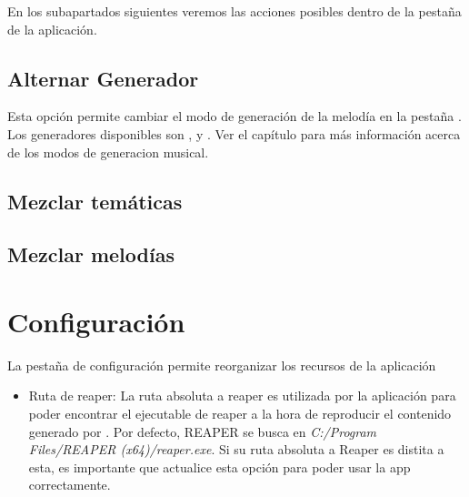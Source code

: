 En los subapartados siguientes veremos las acciones posibles dentro de la pestaña \advancedTabName{} de la aplicación.

\subsection{Alternar Generador}
\label{subsec:app:alternarGenerador}
Esta opción permite cambiar el modo de generación de la melodía en la pestaña \generationTabName{}. Los generadores disponibles son ,  y . Ver el capítulo  para más información acerca de los modos de generacion musical. 

\subsection{Mezclar temáticas}
\label{subsec:app:mixThemes}

\subsection{Mezclar melodías}
\label{subsec:app:mixMelodies}

\section{Configuración}
\label{sec:app:configuration}

La pestaña de configuración permite reorganizar los recursos de la aplicación

\begin{itemize}
    \item Ruta de reaper: La ruta absoluta a reaper es utilizada por la aplicación para poder encontrar el ejecutable de reaper a la hora de reproducir el contenido generado por \appName{}. Por defecto, REAPER se busca en \textit{C:/Program Files/REAPER (x64)/reaper.exe}. Si su ruta absoluta a Reaper es distita a esta, es importante que actualice esta opción para poder usar la app correctamente.
\end{itemize}